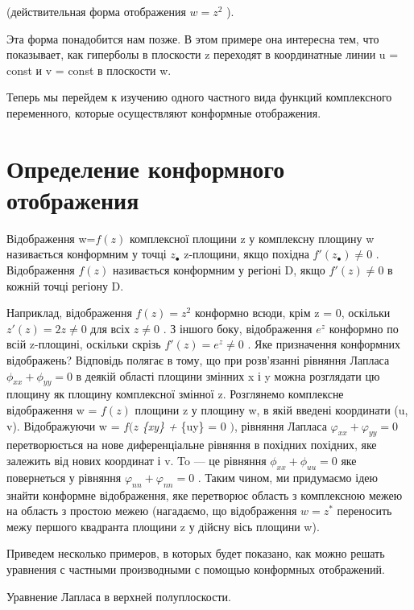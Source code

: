\documentclass[
  ukrainian,
]{article}
\begin{document}
(действительная форма отображения \(w=z^2\) ).

Эта форма понадобится нам позже. В этом примере она интересна тем, что
показывает, как гиперболы в плоскости z переходят в координатные линии u
= const и v = const в плоскости w.

Теперь мы перейдем к изучению одного частного вида функций комплексного
переменного, которые осуществляют конформные отображения.

\section{Определение конформного
отображения}\label{ux43eux43fux440ux435ux434ux435ux43bux435ux43dux438ux435-ux43aux43eux43dux444ux43eux440ux43cux43dux43eux433ux43e-ux43eux442ux43eux431ux440ux430ux436ux435ux43dux438ux44f-1}

Відображення w=\(f(z)\) комплексної площини z у комплексну площину w
називається конформним у точці \(z_{\bullet}\) z-площини, якщо похідна
\(f'(z_{\bullet}) \neq 0\) . Відображення \(f(z)\) називається
конформним у регіоні D, якщо \(f'(z) \neq 0\) в кожній точці регіону D.

Наприклад, відображення \(f(z) = z^2\) конформно всюди, крім z = 0,
оскільки \(z'(z) = 2z \neq 0\) для всіх \(z \neq 0\) . З іншого боку,
відображення \(e^z\) конформно по всій z-площині, оскільки скрізь
\(f'(z) = e^z \neq 0\) . Яке призначення конформних відображень?
Відповідь полягає в тому, що при розв'язанні рівняння Лапласа
\(\phi_{xx} + \phi_{yy} = 0\) в деякій області площини змінних x і y
можна розглядати цю площину як площину комплексної змінної z. Розглянемо
комплексне відображення w = \(f(z)\) площини z у площину w, в якій
введені координати (u, v). Відображуючи w = \(f(z\) \phi\emph{\{xy\} +
\phi}\{uy\} = 0 \()\), рівняння Лапласа
\(\varphi_{xx} + \varphi_{yy} = 0\) перетворюється на нове
диференціальне рівняння в похідних похідних, яке залежить від нових
координат і v. To --- це рівняння \(\phi_{xx} + \phi_{uu} = 0\) яке
повернеться у рівняння \(\varphi_{nn} + \varphi_{nn} = 0\) . Таким
чином, ми придумаємо ідею знайти конформне відображення, яке перетворює
область з комплексною межею на область з простою межею (нагадаємо, що
відображення \(w=z^*\) переносить межу першого квадранта площини z у
дійсну вісь площини w).

Приведем несколько примеров, в которых будет показано, как можно решать
уравнения с частными производными с помощью конформных отображений.

Уравнение Лапласа в верхней полуплоскости.
\end{document}
